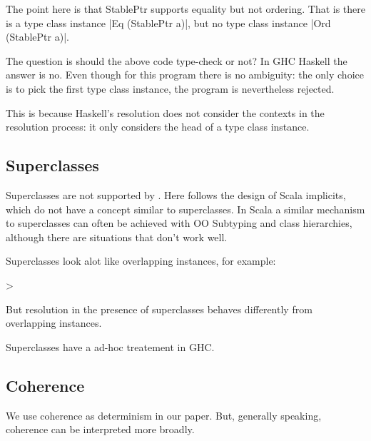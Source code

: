 The point here is that StablePtr supports equality but not ordering. That is there 
is a type class instance |Eq (StablePtr a)|, but no type class instance |Ord (StablePtr a)|. 

The question is should the above code type-check or not? In GHC Haskell the answer is no. 
Even though for this program there is no ambiguity: the only choice is to pick the first 
type class instance, the program is nevertheless rejected. 

This is because Haskell's resolution does not consider the contexts in the resolution process:
it only considers the head of a type class instance. 

\subsection{Superclasses}

Superclasses are not supported by \name. Here \name follows the design of Scala implicits, which 
do not have a concept similar to superclasses. In Scala a similar mechanism to 
superclasses can often be achieved with OO Subtyping and class hierarchies, although there are situations 
that don't work well.  

Superclasses look alot like overlapping instances, for example:

>

But resolution in the presence of superclasses behaves differently from overlapping instances. 

Superclasses have a ad-hoc treatement in GHC. 

\subsection{Coherence}

We use coherence as determinism in our paper. But, generally speaking, coherence can be interpreted
more broadly. 


 
